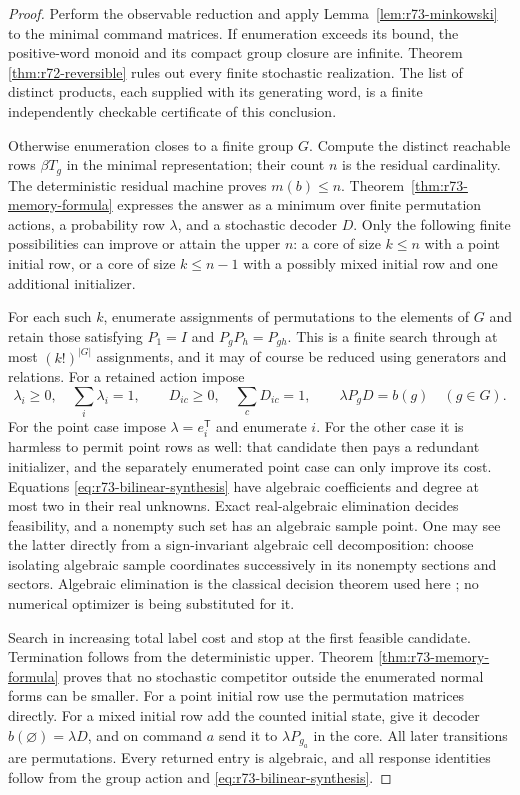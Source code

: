 \begin{proof}
Perform the observable reduction and apply Lemma~\ref{lem:r73-minkowski}
to the minimal command matrices. If enumeration exceeds its bound, the
positive-word monoid and its compact group closure are infinite. Theorem
\ref{thm:r72-reversible} rules out every finite stochastic realization.
The list of distinct products, each supplied with its generating word,
is a finite independently checkable certificate of this conclusion.

Otherwise enumeration closes to a finite group $G$. Compute the distinct
reachable rows $\beta T_g$ in the minimal representation; their count $n$
is the residual cardinality. The deterministic residual machine proves
$m(b)\le n$. Theorem~\ref{thm:r73-memory-formula} expresses the answer as
a minimum over finite permutation actions, a probability row $\lambda$,
and a stochastic decoder $D$. Only the following finite possibilities can
improve or attain the upper $n$: a core of size $k\le n$ with a point
initial row, or a core of size $k\le n-1$ with a possibly mixed initial
row and one additional initializer.

For each such $k$, enumerate assignments of permutations to the elements
of $G$ and retain those satisfying
$P_1=I$ and $P_gP_h=P_{gh}$. This is a finite search through at most
$(k!)^{|G|}$ assignments, and it may of course be reduced using generators
and relations. For a retained action impose
\begin{equation}\label{eq:r73-bilinear-synthesis}
 \lambda_i\ge0,\quad\sum_i\lambda_i=1,\qquad
 D_{ic}\ge0,\quad\sum_cD_{ic}=1,\qquad
 \lambda P_gD=b(g)\quad(g\in G).
\end{equation}
For the point case impose $\lambda=e_i^{\mathsf T}$ and enumerate $i$.
For the other case it is harmless to permit point rows as well: that
candidate then pays a redundant initializer, and the separately enumerated
point case can only improve its cost. Equations
\eqref{eq:r73-bilinear-synthesis} have algebraic coefficients and degree
at most two in their real unknowns. Exact real-algebraic elimination
decides feasibility, and a nonempty such set has an algebraic sample point.
One may see the latter directly from a sign-invariant algebraic cell
decomposition: choose isolating algebraic sample coordinates successively
in its nonempty sections and sectors. Algebraic elimination is the
classical decision theorem used here \cite{Seidenberg54}; no numerical
optimizer is being substituted for it.

Search in increasing total label cost and stop at the first feasible
candidate. Termination follows from the deterministic upper. Theorem
\ref{thm:r73-memory-formula} proves that no stochastic competitor outside
the enumerated normal forms can be smaller. For a point initial row use
the permutation matrices directly. For a mixed initial row add the
counted initial state, give it decoder $b(\varnothing)=\lambda D$, and
on command $a$ send it to $\lambda P_{g_a}$ in the core. All later
transitions are permutations. Every returned entry is algebraic, and all
response identities follow from the group action and
\eqref{eq:r73-bilinear-synthesis}.


\end{proof}

